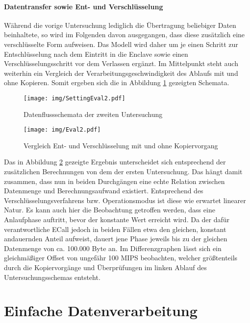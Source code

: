 \paragraph{Datentransfer sowie Ent- und Verschlüsselung}

Während die vorige Untersuchung lediglich die Übertragung beliebiger Daten beinhaltete, so wird im Folgenden davon ausgegangen, dass diese zusätzlich eine verschlüsselte Form aufweisen. Das Modell wird daher um je einen Schritt zur Entschlüsselung nach dem Eintritt in die Enclave sowie einen Verschlüsselungsschritt vor dem Verlassen ergänzt. Im Mittelpunkt steht auch weiterhin ein Vergleich der Verarbeitungsgeschwindigkeit des Ablaufs mit und ohne Kopieren. Somit ergeben sich die in Abbildung \ref{fig:settingeval2} gezeigten Schemata.

\begin{figure}[h]
	\texttt{[image: img/SettingEval2.pdf]}
	\centering
	\caption{Datenflussschemata der zweiten Untersuchung}
	\label{fig:settingeval2}
\end{figure}

\begin{figure}[h]
	\texttt{[image: img/Eval2.pdf]}
	\centering
	\caption{Vergleich Ent- und Verschlüsselung mit und ohne Kopiervorgang}
	\label{fig:eval2}
\end{figure}

Das in Abbildung \ref{fig:eval2} gezeigte Ergebnis unterscheidet sich entsprechend der zusätzlichen Berechnungen von dem der ersten Untersuchung. Das hängt damit zusammen, dass nun in beiden Durchgängen eine echte Relation zwischen Datenmenge und Berechnungsaufwand existiert. Entsprechend des Verschlüsselungsverfahrens bzw. Operationsmodus ist diese wie erwartet linearer Natur. Es kann auch hier die Beobachtung getroffen werden, dass eine Anlaufphase auftritt, bevor der konstante Wert erreicht wird. Da der dafür verantwortliche \ac{ECall} jedoch in beiden Fällen etwa den gleichen, konstant andauernden Anteil aufweist, dauert jene Phase jeweils bis zu der gleichen Datenmenge von ca. 100.000 Byte an. Im Differenzgraphen lässt sich ein gleichmäßiger Offset von ungefähr 100 \ac{MIPS} beobachten, welcher größtenteils durch die Kopiervorgänge und Überprüfungen im linken Ablauf des Untersuchungsschemas entsteht.

\section{Einfache Datenverarbeitung}

